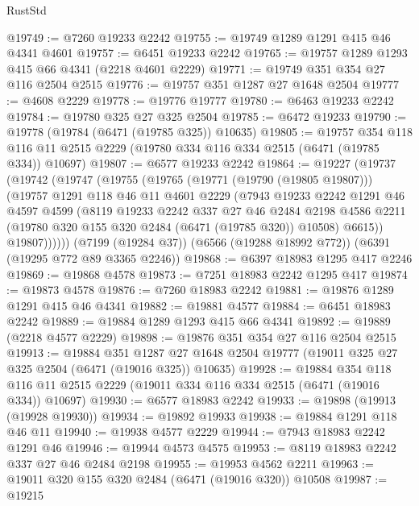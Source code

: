 \begin{lexlean}{RustStd}
\begin{coremodule}
{\begin{coremodule}
{{{{{{{{{{{{{{{{{{{{{{{{{{@19749 := @7260 @19233 @2242
@19755 := @19749 @1289 @1291 @415 @46 @4341 @4601
@19757 := @6451 @19233 @2242
@19765 := @19757 @1289 @1293 @415 @66 @4341 (@2218 @4601 @2229)
@19771 := @19749 @351 @354 @27 @116 @2504 @2515
@19776 := @19757 @351 @1287 @27 @1648 @2504
@19777 := @4608 @2229
@19778 := @19776 @19777
@19780 := @6463 @19233 @2242
@19784 := @19780 @325 @27 @325 @2504
@19785 := @6472 @19233
@19790 := @19778 (@19784 (@6471 (@19785 @325)) @10635)
@19805 := @19757
    @354
    @118
    @116
    @11
    @2515
    @2229
    (@19780 @334 @116 @334 @2515 (@6471 (@19785 @334)) @10697)
@19807 := @6577 @19233 @2242
@19864 := @19227
    (@19737
      (@19742
        (@19747
          (@19755
            (@19765
              (@19771 (@19790 (@19805 @19807)))
              (@19757
                @1291
                @118
                @46
                @11
                @4601
                @2229
                (@7943
                  @19233
                  @2242
                  @1291
                  @46
                  @4597
                  @4599
                  (@8119
                    @19233
                    @2242
                    @337
                    @27
                    @46
                    @2484
                    @2198
                    @4586
                    @2211
                    (@19780 @320 @155 @320 @2484 (@6471 (@19785 @320)) @10508)
                    @6615))
                @19807))))))
    (@7199 (@19284 @37))
    (@6566 (@19288 @18992 @772))
    (@6391 (@19295 @772 @89 @3365 @2246))
@19868 := @6397 @18983 @1295 @417 @2246
@19869 := @19868 @4578
@19873 := @7251 @18983 @2242 @1295 @417
@19874 := @19873 @4578
@19876 := @7260 @18983 @2242
@19881 := @19876 @1289 @1291 @415 @46 @4341
@19882 := @19881 @4577
@19884 := @6451 @18983 @2242
@19889 := @19884 @1289 @1293 @415 @66 @4341
@19892 := @19889 (@2218 @4577 @2229)
@19898 := @19876 @351 @354 @27 @116 @2504 @2515
@19913 := @19884
    @351
    @1287
    @27
    @1648
    @2504
    @19777
    (@19011 @325 @27 @325 @2504 (@6471 (@19016 @325)) @10635)
@19928 := @19884
    @354
    @118
    @116
    @11
    @2515
    @2229
    (@19011 @334 @116 @334 @2515 (@6471 (@19016 @334)) @10697)
@19930 := @6577 @18983 @2242
@19933 := @19898 (@19913 (@19928 @19930))
@19934 := @19892 @19933
@19938 := @19884 @1291 @118 @46 @11
@19940 := @19938 @4577 @2229
@19944 := @7943 @18983 @2242 @1291 @46
@19946 := @19944 @4573 @4575
@19953 := @8119 @18983 @2242 @337 @27 @46 @2484 @2198
@19955 := @19953 @4562 @2211
@19963 := @19011 @320 @155 @320 @2484 (@6471 (@19016 @320)) @10508
@19987 := @19215
}}}}}}}}}}}}}}}}}}}}}}}}}}
\end{coremodule}}
\end{coremodule}
\end{lexlean}
